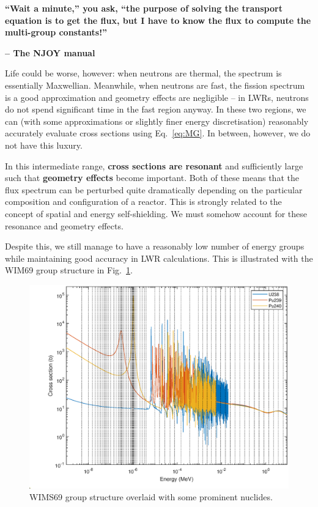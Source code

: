 \begin{displayquote}
\textbf{``Wait a minute,'' you ask, ``the purpose of solving the transport equation is to get the flux, but I have to know the flux to compute the multi-group constants!''}

\textbf{-- The NJOY manual}
\end{displayquote}

Life could be worse, however: when neutrons are thermal, the spectrum is essentially Maxwellian. Meanwhile, when neutrons are fast, the fission spectrum is a good approximation and geometry effects are negligible -- in LWRs, neutrons do not spend significant time in the fast region anyway. In these two regions, we can (with some approximations or slightly finer energy discretisation) reasonably accurately evaluate cross sections using Eq.~\eqref{eq:MG}. In between, however, we do not have this luxury.

In this intermediate range, \textbf{cross sections are resonant} and sufficiently large such that \textbf{geometry effects} become important. Both of these means that the flux spectrum can be perturbed quite dramatically depending on the particular composition and configuration of a reactor. This is strongly related to the concept of spatial and energy self-shielding. We must somehow account for these resonance and geometry effects.

Despite this, we still manage to have a reasonably low number of energy groups while maintaining good accuracy in LWR calculations. This is illustrated with the WIM69 group structure in Fig.~\ref{fig:WIMS}.

\begin{figure}[h]
  \centering
  \includegraphics[scale=0.70]{./Figures/intro/cross_sections_WIMS69.eps} 
  \caption{WIMS69 group structure overlaid with some prominent nuclides.} 
  \label{fig:WIMS}
\end{figure}

